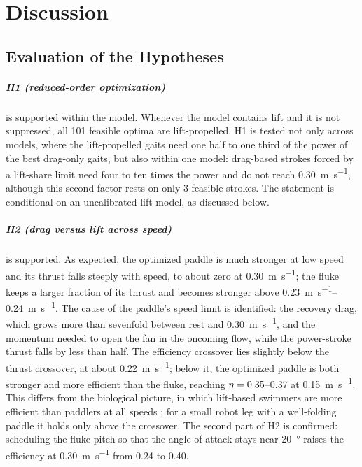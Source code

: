 \chapter{Discussion}
\label{ch:discussion}

\section{Evaluation of the Hypotheses}
\label{sec:disc-hyp}

\paragraph{H1 (reduced-order optimization)} is supported within the model. Whenever the model contains lift and it is not
suppressed, all 101 feasible optima are lift-propelled. H1 is tested not only across models, where the lift-propelled gaits
need one half to one third of the power of the best drag-only gaits, but also within one model: drag-based strokes forced by
a lift-share limit need four to ten times the power and do not reach \SI{0.30}{\metre\per\second}, although this second factor
rests on only 3 feasible strokes. The statement is conditional on an uncalibrated lift model, as discussed below.

\paragraph{H2 (drag versus lift across speed)} is supported. As expected, the optimized paddle
is much stronger at low speed and its thrust falls steeply with speed, to about zero at \SI{0.30}{\metre\per\second}; the
fluke keeps a larger fraction of its thrust and becomes stronger above \SIrange{0.23}{0.24}{\metre\per\second}. The cause of
the paddle's speed limit is identified: the recovery drag, which grows more than sevenfold between rest and
\SI{0.30}{\metre\per\second}, and the momentum needed to open the fan in the oncoming flow, while the power-stroke thrust falls
by less than half. The efficiency crossover lies slightly below the thrust crossover, at about \SI{0.22}{\metre\per\second}; below it, the optimized paddle is both stronger and more efficient than the fluke, reaching $\eta=0.35$--0.37 at \SI{0.15}{\metre\per\second}. This differs from the biological picture, in which lift-based swimmers are more efficient than paddlers at all speeds \cite{Fish1996}; for a small robot leg with a well-folding paddle it holds only above the crossover. The second part of H2 is confirmed: scheduling the fluke
pitch so that the angle of attack stays near \SI{20}{\degree} raises the efficiency at \SI{0.30}{\metre\per\second} from 0.24 to 0.40.

